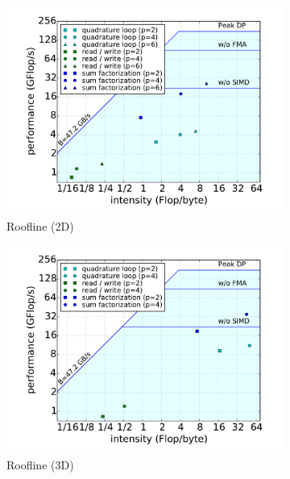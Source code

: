 \documentclass[times,doublespace]{nmeauth}
\begin{document}
\begin{figure}[!ht]
  \centering
  \begin{subfigure}[b]{0.49\textwidth}
      \centering
      \includegraphics[width=\textwidth]{LIKWID_Emmy_RRZE_breakdown_roofline_2d.pdf}
      \caption{Roofline (2D)}
      \label{fig:roofline_2d_tensor4}
  \end{subfigure}
  \begin{subfigure}[b]{0.49\textwidth}
    \centering
    \includegraphics[width=\textwidth]{LIKWID_Emmy_RRZE_breakdown_roofline_3d.pdf}
    \caption{Roofline (3D)}
    \label{fig:roofline_3d_tensor4}
  \end{subfigure}
  ~
  \begin{subfigure}[b]{0.49\textwidth}

\end{subfigure}
\end{figure}
\end{document}
